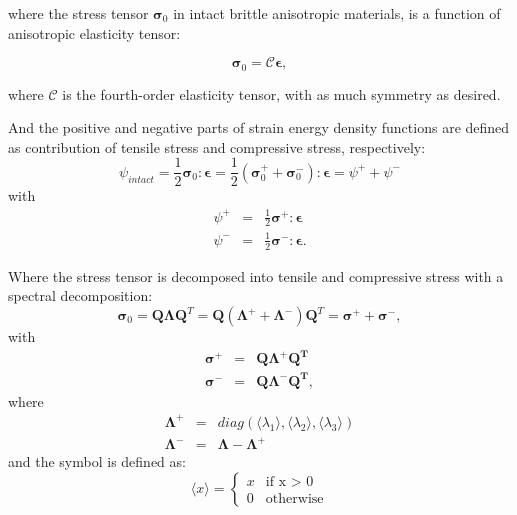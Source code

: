 \documentclass[3p,10pt,sort&compress]{elsarticle}
\begin{document}
where the stress tensor $\boldsymbol{\sigma}_0$ in intact brittle anisotropic materials, is a function of anisotropic elasticity tensor:

\begin{equation}
\boldsymbol{\sigma}_0 = \boldsymbol{\mathcal{C}} \boldsymbol{\epsilon},
\end{equation}

where $\boldsymbol{\mathcal{C}}$ is the fourth-order elasticity tensor, with as much symmetry as desired.



And the positive and negative parts of strain energy density functions are defined as contribution of tensile stress and compressive stress, respectively:
\begin{equation}
  \psi_{intact} = \frac{1}{2}\boldsymbol{\sigma}_0 : \boldsymbol{\epsilon}=\frac{1}{2}(\boldsymbol{\sigma}_0^+ + \boldsymbol{\sigma}_0^-) : \boldsymbol{\epsilon} = \psi^+ + \psi^-
\end{equation}
with
\begin{eqnarray}
\psi^{+} &=& \frac{1}{2} \boldsymbol{\sigma}^{+} : \boldsymbol{\epsilon} \label{eq:psip}\\
\psi^{-} &=& \frac{1}{2} \boldsymbol{\sigma}^{-} : \boldsymbol{\epsilon}.
\end{eqnarray}

Where the stress tensor is decomposed into tensile and compressive stress with a spectral decomposition:
\begin{equation}
\boldsymbol{\sigma}_0 = \boldsymbol{Q} \boldsymbol{\Lambda} \boldsymbol{Q}^T = \boldsymbol{Q} (\mathbf{\Lambda}^{+} + \mathbf{\Lambda}^{-}) \boldsymbol{Q}^T = \boldsymbol{\sigma}^+ + \boldsymbol{\sigma}^-,
\end{equation}
with
\begin{eqnarray}
\boldsymbol{\sigma}^+ &=& \mathbf{Q} \mathbf{\Lambda^{+}} \mathbf{Q^{T}} \label{eq:sigmap}\\
\boldsymbol{\sigma}^- &=& \mathbf{Q} \mathbf{\Lambda^{-}} \mathbf{Q^{T}},
\end{eqnarray}
where
\begin{eqnarray}
  \mathbf{\Lambda}^{+} &=& diag (\langle \lambda_1 \rangle, \langle \lambda_2 \rangle, \langle \lambda_3 \rangle) \\
  \mathbf{\Lambda}^{-} &=& \mathbf{\Lambda} - \mathbf{\Lambda}^{+}
\end{eqnarray}
and the symbol is defined as:
\begin{equation}
  \langle x \rangle =
    \begin{cases}
      x & \text{if x $>$ 0}\\
      0 & \text{otherwise}
    \end{cases}
\end{equation}
\end{document}
